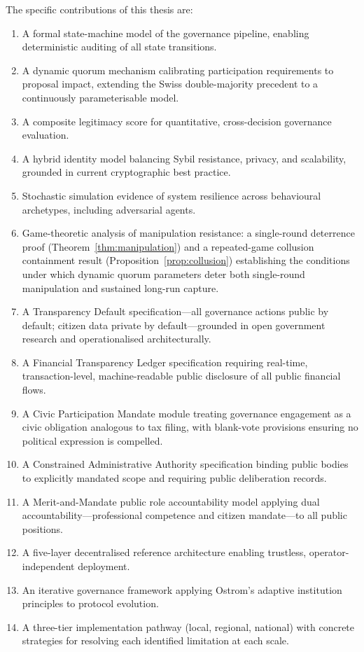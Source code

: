 \documentclass[12pt,a4paper,oneside]{report}
\begin{document}
The specific contributions of this thesis are:
\begin{enumerate}
  \item A formal state-machine model of the governance pipeline, enabling deterministic auditing of all state transitions.
  \item A dynamic quorum mechanism calibrating participation requirements to proposal impact, extending the Swiss double-majority precedent to a continuously parameterisable model.
  \item A composite legitimacy score for quantitative, cross-decision governance evaluation.
  \item A hybrid identity model balancing Sybil resistance, privacy, and scalability, grounded in current cryptographic best practice.
  \item Stochastic simulation evidence of system resilience across behavioural archetypes, including adversarial agents.
  \item Game-theoretic analysis of manipulation resistance: a single-round deterrence proof (Theorem~\ref{thm:manipulation}) and a repeated-game collusion containment result (Proposition~\ref{prop:collusion}) establishing the conditions under which dynamic quorum parameters deter both single-round manipulation and sustained long-run capture.
  \item A Transparency Default specification---all governance actions public by default; citizen data private by default---grounded in open government research \citep{oecd2020open} and operationalised architecturally.
  \item A Financial Transparency Ledger specification requiring real-time, transaction-level, machine-readable public disclosure of all public financial flows.
  \item A Civic Participation Mandate module treating governance engagement as a civic obligation analogous to tax filing, with blank-vote provisions ensuring no political expression is compelled.
  \item A Constrained Administrative Authority specification binding public bodies to explicitly mandated scope and requiring public deliberation records.
  \item A Merit-and-Mandate public role accountability model applying dual accountability---professional competence and citizen mandate---to all public positions.
  \item A five-layer decentralised reference architecture enabling trustless, operator-independent deployment.
  \item An iterative governance framework applying Ostrom's adaptive institution principles to protocol evolution.
  \item A three-tier implementation pathway (local, regional, national) with concrete strategies for resolving each identified limitation at each scale.
\end{enumerate}
\end{document}
